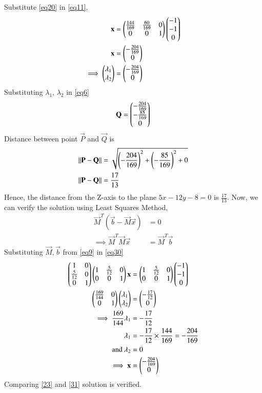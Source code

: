 \documentclass[journal,12pt,twocolumn]{IEEEtran}
\begin{document}
Substitute \eqref{eq20} in \eqref{eq11},
\begin{align}\label{23}
	\mathbf{x} &= \begin{pmatrix}\frac{144}{169} & \frac{60}{169} & 0\\0 & 0 & 1\end{pmatrix}\begin{pmatrix}-1\\-1\\0\end{pmatrix} \\
	\mathbf{x} &= \begin{pmatrix}-\frac{204}{169}\\0\end{pmatrix} \\
	\implies\begin{pmatrix}\lambda_1 \\ \lambda_2\end{pmatrix} &= \begin{pmatrix}-\frac{204}{169}\\0\end{pmatrix}
\end{align}
Substituting $\lambda_1$, $\lambda_2$ in \eqref{eq6}
\begin{equation}
	\mathbf{Q} = \begin{pmatrix}-\frac{204}{169}\\-\frac{85}{169}\\0\end{pmatrix}
\end{equation}
Distance between point $\vec{P}$ and $\vec{Q}$ is
\begin{align}
	\left\lVert\mathbf{P}-\mathbf{Q}\right\rVert &= \sqrt{\left(-\frac{204}{169}\right)^2 +\left(-\frac{85}{169}\right)^2 + 0}\\
	\left\lVert\mathbf{P}-\mathbf{Q}\right\rVert &= \frac{17}{13} 
\end{align}
Hence, the distance from the Z-axis to the plane $5x - 12y - 8 = 0$ is $\frac{17}{13}$. Now, we can verify the solution using Least Squares Method,
\begin{align}
	\vec{M}^T(\vec{b} - \vec{M}\vec{x}) &= 0\\
	\label{eq30}\implies \vec{M}^T\vec{M}\vec{x} &= \vec{M}^T\vec{b}
\end{align}
Substituting $\vec{M}, \vec{b}$ from \eqref{eq9} in \eqref{eq30}
\begin{align}
	\begin{pmatrix}1 & 0\\\frac{5}{12} & 0\\0 & 1\end{pmatrix}\begin{pmatrix}1 & \frac{5}{12} & 0\\0 & 0 & 1\end{pmatrix}\mathbf{x} &= \begin{pmatrix}1 & \frac{5}{12} & 0\\0 & 0 & 1\end{pmatrix}\begin{pmatrix}-1\\-1\\0\end{pmatrix}\\
	\begin{pmatrix}\frac{169}{144} & 0\\0 & 1\end{pmatrix}\begin{pmatrix}\lambda_1\\\lambda_2\end{pmatrix} &= \begin{pmatrix}-\frac{17}{12}\\0\end{pmatrix}\\
	\implies\frac{169}{144}\lambda_1 &= -\frac{17}{12}\\
	\lambda_1 &= -\frac{17}{12} \times \frac{144}{169} = -\frac{204}{169}\\
	\text{and }\lambda_2 &= 0\\
	\label{31}\implies\mathbf{x} &= \begin{pmatrix}-\frac{204}{169}\\0\end{pmatrix}
\end{align}
Comparing \eqref{23} and \eqref{31} solution is verified.
\end{document}
